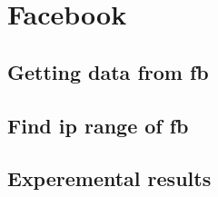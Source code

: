 \section{Facebook}

\subsection{Getting data from fb}
\subsection{Find ip range of fb}
\subsection{Experemental results}